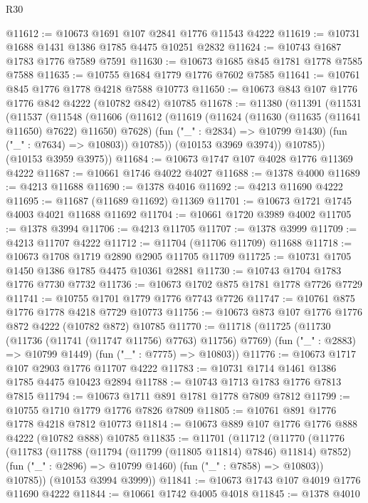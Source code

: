 \begin{lexlean}{R30}
\begin{coremodule}
{{{{{@11612 := @10673 @1691 @107 @2841 @1776 @11543 @4222
@11619 := @10731 @1688 @1431 @1386 @1785 @4475 @10251 @2832
@11624 := @10743 @1687 @1783 @1776 @7589 @7591
@11630 := @10673 @1685 @845 @1781 @1778 @7585 @7588
@11635 := @10755 @1684 @1779 @1776 @7602 @7585
@11641 := @10761 @845 @1776 @1778 @4218 @7588 @10773
@11650 := @10673 @843 @107 @1776 @1776 @842 @4222 (@10782 @842) @10785
@11678 := @11380
    (@11391
      (@11531
        (@11537
          (@11548
            (@11606
              (@11612
                (@11619
                  (@11624 (@11630 (@11635 (@11641 @11650) @7622) @11650) @7628)
                  (fun ("_" : @2834) => @10799 @1430)
                  (fun ("_" : @7634) => @10803))
                @10785))
            (@10153 @3969 @3974))
          @10785))
      (@10153 @3959 @3975))
@11684 := @10673 @1747 @107 @4028 @1776 @11369 @4222
@11687 := @10661 @1746 @4022 @4027
@11688 := @1378 @4000
@11689 := @4213 @11688
@11690 := @1378 @4016
@11692 := @4213 @11690 @4222
@11695 := @11687 (@11689 @11692) @11369
@11701 := @10673 @1721 @1745 @4003 @4021 @11688 @11692
@11704 := @10661 @1720 @3989 @4002
@11705 := @1378 @3994
@11706 := @4213 @11705
@11707 := @1378 @3999
@11709 := @4213 @11707 @4222
@11712 := @11704 (@11706 @11709) @11688
@11718 := @10673 @1708 @1719 @2890 @2905 @11705 @11709
@11725 := @10731 @1705 @1450 @1386 @1785 @4475 @10361 @2881
@11730 := @10743 @1704 @1783 @1776 @7730 @7732
@11736 := @10673 @1702 @875 @1781 @1778 @7726 @7729
@11741 := @10755 @1701 @1779 @1776 @7743 @7726
@11747 := @10761 @875 @1776 @1778 @4218 @7729 @10773
@11756 := @10673 @873 @107 @1776 @1776 @872 @4222 (@10782 @872) @10785
@11770 := @11718
    (@11725
      (@11730 (@11736 (@11741 (@11747 @11756) @7763) @11756) @7769)
      (fun ("_" : @2883) => @10799 @1449)
      (fun ("_" : @7775) => @10803))
@11776 := @10673 @1717 @107 @2903 @1776 @11707 @4222
@11783 := @10731 @1714 @1461 @1386 @1785 @4475 @10423 @2894
@11788 := @10743 @1713 @1783 @1776 @7813 @7815
@11794 := @10673 @1711 @891 @1781 @1778 @7809 @7812
@11799 := @10755 @1710 @1779 @1776 @7826 @7809
@11805 := @10761 @891 @1776 @1778 @4218 @7812 @10773
@11814 := @10673 @889 @107 @1776 @1776 @888 @4222 (@10782 @888) @10785
@11835 := @11701
    (@11712
      (@11770
        (@11776
          (@11783
            (@11788 (@11794 (@11799 (@11805 @11814) @7846) @11814) @7852)
            (fun ("_" : @2896) => @10799 @1460)
            (fun ("_" : @7858) => @10803))
          @10785))
      (@10153 @3994 @3999))
@11841 := @10673 @1743 @107 @4019 @1776 @11690 @4222
@11844 := @10661 @1742 @4005 @4018
@11845 := @1378 @4010
}}}}}
\end{coremodule}
\end{lexlean}

